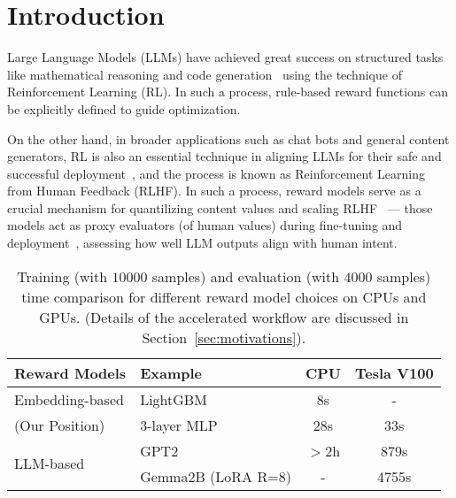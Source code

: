 \section{Introduction}
Large Language Models (LLMs) have achieved great success on structured tasks like mathematical reasoning and code generation~\citep{guo2025deepseek, jaech2024openai, trinh2024solving} using the technique of Reinforcement Learning (RL). In such a process, rule-based reward functions can be explicitly defined to guide optimization.

On the other hand, in broader applications such as chat bots and general content generators, RL is also an essential technique in aligning LLMs for their safe and successful deployment~\citep{christiano2017deep, ouyang2022training,stiennon2020learning}, and the process is known as Reinforcement Learning from Human Feedback (RLHF). In such a process, reward models serve as a crucial mechanism for quantilizing content values and scaling RLHF~\citep{lambert2024rewardbench, wang2024secrets} --- those models act as proxy evaluators (of human values) during fine-tuning and deployment~\citep{dubey2024llama, dong2024rlhf, wang2024arithmetic}, assessing how well LLM outputs align with human intent. 

\begin{table}[t!]
\fontsize{7.8}{12}\selectfont
\centering
\caption{Training (with $10000$ samples) and evaluation (with $4000$ samples) time comparison for different reward model choices on CPUs and GPUs. (Details of the accelerated workflow are discussed in Section~\ref{sec:motivations}).}
\label{tab:execution_time}
\begin{tabular}{l|l|c|c}
\toprule
\textbf{Reward Models} & \textbf{Example} & \textbf{CPU} & \textbf{Tesla V100} \\
\midrule
Embedding-based & LightGBM & 8s    & -    \\
(Our Position)& 3-layer MLP & 28s   & 33s  \\
\hline
\multirow{2}{*}{LLM-based}       & GPT2 & $>$2h   & 879s \\
                                    & Gemma2B (LoRA R=8) & -     & 4755s \\
\bottomrule
\end{tabular}\vspace{-0.3cm}
\end{table}

